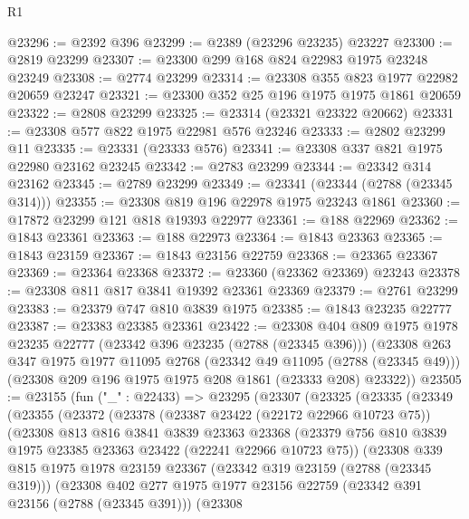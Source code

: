 \begin{lexlean}{R1}
\begin{coremodule}
@23296 := @2392 @396
@23299 := @2389 (@23296 @23235) @23227
@23300 := @2819 @23299
@23307 := @23300 @299 @168 @824 @22983 @1975 @23248 @23249
@23308 := @2774 @23299
@23314 := @23308 @355 @823 @1977 @22982 @20659 @23247
@23321 := @23300 @352 @25 @196 @1975 @1975 @1861 @20659
@23322 := @2808 @23299
@23325 := @23314 (@23321 @23322 @20662)
@23331 := @23308 @577 @822 @1975 @22981 @576 @23246
@23333 := @2802 @23299 @11
@23335 := @23331 (@23333 @576)
@23341 := @23308 @337 @821 @1975 @22980 @23162 @23245
@23342 := @2783 @23299
@23344 := @23342 @314 @23162
@23345 := @2789 @23299
@23349 := @23341 (@23344 (@2788 (@23345 @314)))
@23355 := @23308 @819 @196 @22978 @1975 @23243 @1861
@23360 := @17872 @23299 @121 @818 @19393 @22977
@23361 := @188 @22969
@23362 := @1843 @23361
@23363 := @188 @22973
@23364 := @1843 @23363
@23365 := @1843 @23159
@23367 := @1843 @23156 @22759
@23368 := @23365 @23367
@23369 := @23364 @23368
@23372 := @23360 (@23362 @23369) @23243
@23378 := @23308 @811 @817 @3841 @19392 @23361 @23369
@23379 := @2761 @23299
@23383 := @23379 @747 @810 @3839 @1975
@23385 := @1843 @23235 @22777
@23387 := @23383 @23385 @23361
@23422 := @23308
    @404
    @809
    @1975
    @1978
    @23235
    @22777
    (@23342 @396 @23235 (@2788 (@23345 @396)))
    (@23308
      @263
      @347
      @1975
      @1977
      @11095
      @2768
      (@23342 @49 @11095 (@2788 (@23345 @49)))
      (@23308 @209 @196 @1975 @1975 @208 @1861 (@23333 @208) @23322))
@23505 := @23155
    (fun ("_" : @22433) =>
    @23295
      (@23307
        (@23325
          (@23335
            (@23349
              (@23355
                (@23372
                  (@23378
                    (@23387 @23422 (@22172 @22966 @10723 @75))
                    (@23308
                      @813
                      @816
                      @3841
                      @3839
                      @23363
                      @23368
                      (@23379 @756 @810 @3839 @1975 @23385 @23363 @23422 (@22241 @22966 @10723 @75))
                      (@23308
                        @339
                        @815
                        @1975
                        @1978
                        @23159
                        @23367
                        (@23342 @319 @23159 (@2788 (@23345 @319)))
                        (@23308
                          @402
                          @277
                          @1975
                          @1977
                          @23156
                          @22759
                          (@23342 @391 @23156 (@2788 (@23345 @391)))
                          (@23308

\end{coremodule}
\end{lexlean}
